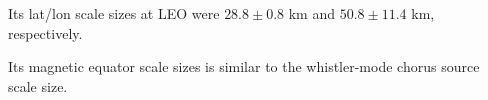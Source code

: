 \documentclass[draft,linenumbers]{agujournal}
\begin{document}






\begin{keypoints}
\item Its lat/lon scale sizes at LEO were $28.8 \pm 0.8$ km and $50.8 \pm 11.4$ km, respectively.
\item Its magnetic equator scale sizes is similar to the whistler-mode chorus source scale size.
\end{keypoints}

%
%

\end{document}
